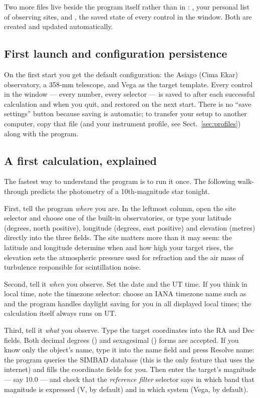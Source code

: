 Two more files live beside the program itself rather than in :
, your personal list of observing sites, and
, the saved state of every control in the
window. Both are created and updated automatically.

\subsection{First launch and configuration persistence}

On the first start you get the default configuration: the Asiago (Cima
Ekar) observatory, a 358-mm telescope, and Vega as the target template.
Every control in the window --- every number, every selector --- is saved
to  after each successful calculation and
when you quit, and restored on the next start. There is no ``save
settings'' button because saving is automatic; to transfer your setup to
another computer, copy that file (and your instrument profile, see
Sect.~\ref{sec:profiles}) along with the program.

\subsection{A first calculation, explained}

The fastest way to understand the program is to run it once. The
following walk-through predicts the photometry of a 10th-magnitude star
tonight.

First, tell the program \emph{where} you are. In the leftmost column,
open the site selector and choose one of the built-in observatories, or
type your latitude (degrees, north positive), longitude (degrees, east
positive) and elevation (metres) directly into the three fields. The
site matters more than it may seem: the latitude and longitude determine
when and how high your target rises, the elevation sets the atmospheric
pressure used for refraction and the air mass of turbulence responsible
for scintillation noise.

Second, tell it \emph{when} you observe. Set the date and the UT time.
If you think in local time, note the timezone selector: choose an IANA
timezone name such as  and the program handles daylight
saving for you in all displayed local times; the calculation itself
always runs on UT.

Third, tell it \emph{what} you observe. Type the target coordinates into
the RA and Dec fields. Both decimal degrees () and
sexagesimal () forms are accepted. If you know only the
object's name, type it into the name field and press \textsf{Resolve
name}: the program queries the SIMBAD database (this is the only feature
that uses the internet) and fills the coordinate fields for you. Then
enter the target's magnitude --- say 10.0 --- and check that the
\emph{reference filter} selector says in which band that magnitude is
expressed (V, by default) and in which system (Vega, by default).


